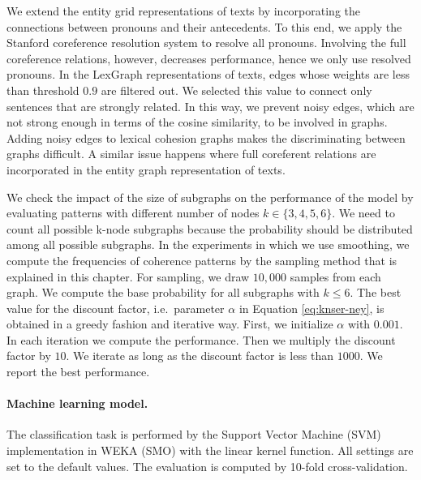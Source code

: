 We extend the entity grid representations of texts by incorporating the connections between pronouns and their antecedents. 
To this end, we apply the Stanford coreference resolution system \cite{leeheeyoung13} to resolve all pronouns. 
Involving the full coreference relations, however, decreases performance, hence we only use resolved pronouns. 
In the LexGraph representations of texts, edges whose weights are less than threshold $0.9$ are filtered out. 
We selected this value to connect only sentences that are strongly related. 
In this way, we prevent noisy edges, which are not strong enough in terms of the cosine similarity, to be involved in graphs. 
Adding noisy edges to lexical cohesion graphs makes the discriminating between graphs difficult.
A similar issue happens where full coreferent relations are incorporated in the entity graph representation of texts.   

We check the impact of the size of subgraphs on the performance of the model by evaluating patterns with different number of nodes $k \in \lbrace3,4,5,6\rbrace$. 
We need to count all possible k-node subgraphs because the probability should be distributed among all possible subgraphs.  
In the experiments in which we use smoothing, we compute the frequencies of coherence patterns by the sampling method that is explained in this chapter.  
For sampling, we draw $10,000$ samples from each graph. 
We compute the base probability for all subgraphs with $k \leq 6$.  
The best value for the discount factor, i.e.\ parameter $\alpha$ in Equation \ref{eq:knser-ney}, is obtained in a greedy fashion and iterative way.   
First, we initialize $\alpha$ with $0.001$. 
In each iteration we compute the performance. 
Then we multiply the discount factor by $10$. 
We iterate as long as the discount factor is less than $1000$. 
We report the best performance.
 
\paragraph{Machine learning model.}
The classification task is performed by the Support Vector Machine (SVM) implementation in WEKA (SMO) with the linear kernel function.  
All settings are set to the default values. 
The evaluation is computed by \mbox{10-fold} \mbox{cross-validation}. 

